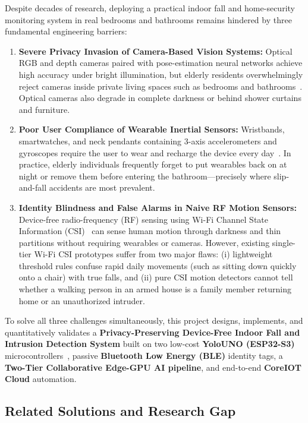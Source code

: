 \documentclass{hcmut-report}
\begin{document}
Despite decades of research, deploying a practical indoor fall and home-security monitoring system in real bedrooms and bathrooms remains hindered by three fundamental engineering barriers:
\begin{enumerate}
  \item \textbf{Severe Privacy Invasion of Camera-Based Vision Systems:} Optical RGB and depth cameras paired with pose-estimation neural networks achieve high accuracy under bright illumination, but elderly residents overwhelmingly reject cameras inside private living spaces such as bedrooms and bathrooms~\cite{wang_wifi_fall}. Optical cameras also degrade in complete darkness or behind shower curtains and furniture.
  \item \textbf{Poor User Compliance of Wearable Inertial Sensors:} Wristbands, smartwatches, and neck pendants containing 3-axis accelerometers and gyroscopes require the user to wear and recharge the device every day~\cite{mubashir_survey}. In practice, elderly individuals frequently forget to put wearables back on at night or remove them before entering the bathroom---precisely where slip-and-fall accidents are most prevalent.
  \item \textbf{Identity Blindness and False Alarms in Naive RF Motion Sensors:} Device-free radio-frequency (RF) sensing using Wi-Fi Channel State Information (CSI)~\cite{halperin_csitool,yousefi_survey} can sense human motion through darkness and thin partitions without requiring wearables or cameras. However, existing single-tier Wi-Fi CSI prototypes suffer from two major flaws: (i) lightweight threshold rules confuse rapid daily movements (such as sitting down quickly onto a chair) with true falls, and (ii) pure CSI motion detectors cannot tell whether a walking person in an armed house is a family member returning home or an unauthorized intruder.
\end{enumerate}

To solve all three challenges simultaneously, this project designs, implements, and quantitatively validates a \textbf{Privacy-Preserving Device-Free Indoor Fall and Intrusion Detection System} built on two low-cost \textbf{YoloUNO (ESP32-S3)} microcontrollers~\cite{espressif_csi}, passive \textbf{Bluetooth Low Energy (BLE)} identity tags, a \textbf{Two-Tier Collaborative Edge-GPU AI pipeline}, and end-to-end \textbf{CoreIOT Cloud} automation.

\subsection[Related Solutions]{Related Solutions and Research Gap}
\label{sec:related}
\end{document}
